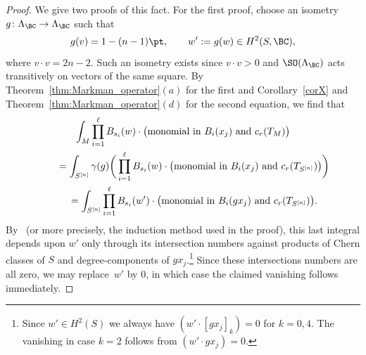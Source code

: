 \begin{proof}
We give two proofs of this fact.
For the first proof, choose an isometry $g \colon \Lambda_{\BC} \to \Lambda_{\BC}$ such that
\[
g(v) = 1- (n-1) \pt, \qquad
w' := g(w) \in H^2(S,\BC) ,
\]
where $v \cdot v = 2n-2$. Such an isometry exists since $v \cdot v > 0$ and $\SO(\Lambda_{\BC})$ acts transitively on vectors of the same square.
By Theorem~\ref{thm:Markman_operator}$(a)$ for the first and Corollary~\ref{corX} and Theorem~\ref{thm:Markman_operator}$(d)$ for the second equation, we find that
\begin{gather*}
\int_{M} \prod_{i=1}^{\ell} B_{s_i}(w) \cdot \big(\textup{monomial in } B_i(x_j) \textup{ and } c_r(T_M)\big)
\\ \qquad
{}=\int_{S^{[n]}} \gamma(g)\bigg(\prod_{i=1}^{\ell} B_{s_i}(w) \cdot \big(\textup{monomial in } B_i(x_j) \textup{ and } c_r(T_{S^{[n]}}) \big) \bigg)
\\ \qquad
{}=\int_{S^{[n]}} \prod_{i=1}^{\ell} B_{s_i}(w') \cdot \big(\textup{monomial in } B_i(gx_j) \textup{ and } c_r(T_{S^{[n]}})\big).
\end{gather*}
By~\cite[Theorem 4.1]{EGL} (or more precisely, the induction method used in the proof),
this last integral depends upon $w'$ only through its intersection numbers against products of Chern classes of $S$ and degree-components of $g x_j$.\footnote{Since $w' \in H^2(S)$ we always have
$(w' \cdot [g x_j]_{k} ) = 0$ for $k=0,4$.
The vanishing in case $k=2$ follows from $(w' \cdot gx_j) = 0$.}
Since these intersections numbers are all zero, we may replace~$w'$ by $0$, in which case the claimed vanishing follows immediately.
\end{proof}

